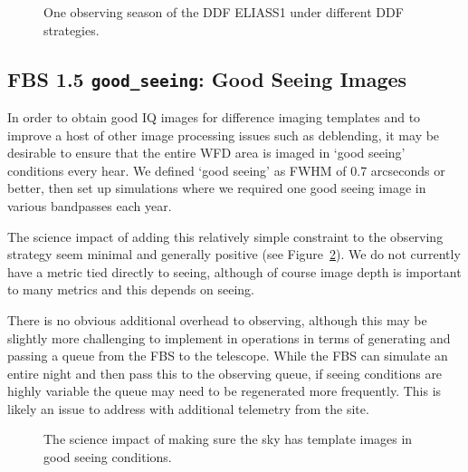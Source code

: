 \begin{figure}
\caption{One observing season of the DDF ELIASS1 under different DDF strategies. }\label{fig:ddfexamples}
\end{figure}




\subsection{FBS 1.5 {\tt good\_seeing}: Good Seeing Images}\label{ss:goodseeing}

In order to obtain good IQ images for difference imaging templates and to improve a host of other image processing issues such as deblending, it may be desirable to ensure that the entire WFD area is imaged in `good seeing' conditions every hear. We defined `good seeing' as FWHM of 0.7 arcseconds or better, then set up simulations where we required one good seeing image in various bandpasses each year.

The science impact of adding this relatively simple constraint to the observing strategy seem minimal and generally positive (see Figure~\ref{fig:goodseeing_radar}). We do not currently have a metric tied directly to seeing, although of course image depth is important to many metrics and this depends on seeing. 

There is no obvious additional overhead to observing, although this may be slightly more challenging to implement in operations in terms of generating and passing a queue from the FBS to the telescope. While the FBS can simulate an entire night and then pass this to the observing queue, if seeing conditions are highly variable the queue may need to be regenerated more frequently. This is likely an issue to address with additional telemetry from the site.

\begin{figure}
\caption{The science impact of making sure the sky has template images in good seeing conditions.} \label{fig:goodseeing_radar}
\end{figure}


